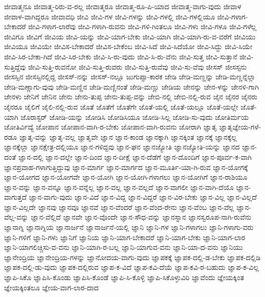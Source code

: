 {ಜೀವಾತ್ಮನೂ
ಜೀವಾತ್ಮ-ರಿರು-ವ-ರಲ್ಲ
ಜೀವಾತ್ಮರೂ
ಜೀವಾತ್ಮ-ರೂ-ಪಿ-ಯಾದ
ಜೀವಾತ್ಮ-ವಾಗು-ವುದು
ಜೀವಾಳ
ಜೀವಾಳ-ವಾಗಿದ್ದರೂ
ಜೀವಾವಧಿ
ಜೀವಿ
ಜೀವಿ-ಗಳ
ಜೀವಿ-ಗಳನ್ನು
ಜೀವಿ-ಗಳಲ್ಲಿ
ಜೀವಿ-ಗಳಲ್ಲಿಯೂ
ಜೀವಿ-ಗಳಾಗ-ಬೇಕಾದರೆ
ಜೀವಿ-ಗಳಾಗ-ಲಾರೆವು
ಜೀವಿ-ಗಳಾಗಿ-ರುವನು
ಜೀವಿ-ಗಳಿ-ಗಿಂತಲೂ
ಜೀವಿ-ಗಳು
ಜೀವಿ-ಗಳೂ
ಜೀವಿ-ಗಳೆಲ್ಲ
ಜೀವಿಗೂ
ಜೀವಿಗೆ
ಜೀವಿಯ
ಜೀವಿ-ಯನ್ನು
ಜೀವಿ-ಯಾಗ-ಬೇಕು
ಜೀವಿ-ಯಾಗಿ
ಜೀವಿ-ಯಾಗಿ-ರು-ವ-ವರೆಗೆ
ಜೀವಿಯು
ಜೀವಿಯೂ
ಜೀವಿಯೇ
ಜೀವಿಸ-ಬೇಕಾದರೆ
ಜೀವಿಸ-ಬೇಕೆಂಬ
ಜೀವಿ-ಸಿದೆ
ಜೀವಿ-ಸಿದೆಯೋ
ಜೀವಿ-ಸಿದ್ದು
ಜೀವಿ-ಸಿಯೇ
ಜೀವಿ-ಸಿರ-ಬೇಕಾ-ಗಿದೆ
ಜೀವಿ-ಸಿರ-ಬೇಕು
ಜೀವಿ-ಸಿ-ರು-ವುದು
ಜೀವಿ-ಸಿ-ರು-ವೆನು
ಜೀವಿ-ಸುತ್ತ
ಜೀವಿ-ಸುತ್ತಾನೆ
ಜೀವಿ-ಸುತ್ತಿದ್ದೆವು
ಜೀವಿ-ಸುತ್ತಿ-ರುವನೋ
ಜೀವಿ-ಸುತ್ತಿ-ರುವರು
ಜೀವಿ-ಸುತ್ತಿ-ರುವೆವು
ಜೀವಿ-ಸು-ವೆವು
ಜೀಸಸ್
ಜೀಸಸ್ಸನು
ಜೀಸಸ್ಸಿನ
ಜೀಸಸ್ಸಿನಲ್ಲಿದ್ದ
ಜೀಸಸ್-ನನ್ನು
ಜೀಸಸ್-ನಲ್ಲೂ
ಜುಗುಪ್ಸಾ-ಕಾರಕ
ಜೇಡಿ
ಜೇಡಿ-ಮಣ್ಣನ್ನು
ಜೇಡಿ-ಮಣ್ಣನ್ನೆಲ್ಲಾ
ಜೇಡಿ-ಮಣ್ಣಾಗು-ವುವು
ಜೇಡಿ-ಮಣ್ಣಿನ
ಜೇಡಿ-ಮಣ್ಣಿನಂತೆ
ಜೇಡಿ-ಮಣ್ಣು
ಜೇಡಿಯ
ಜೇನನ್ನು
ಜೇನ-ಳನ್ನು
ಜೇನಳಿ-ಗಾಗಿ
ಜೇನಳು
ಜೇನಿಗೆ
ಜೇನಿನ
ಜೇನು
ಜೇನು-ತುಪ್ಪ
ಜೇನು-ತುಪ್ಪ-ವನ್ನು
ಜೇಬಿ-ನಲ್ಲಿ
ಜೇಬಿ-ನಲ್ಲಿ-ರುವ
ಜೈನ
ಜೈನರ
ಜೈನರು
ಜೈನರೂ
ಜೈಲಿಗೆ
ಜೈಲಿ-ನಲ್ಲಿ-ರುವ
ಜೊತೆ
ಜೊತೆಗೆ
ಜೊತೆಗೇ
ಜೊತೆ-ಯಲ್ಲಿ
ಜೊತೆ-ಯಲ್ಲೂ
ಜೊತೆ-ಯಲ್ಲೇ
ಜೊತೆ-ಯಾಗಿ
ಜೊರಾಸ್ಟರ್
ಜೋಡಿ-ಯನ್ನು
ಜೋಡಿಸಿ
ಜೋಡಿಸಿಯೂ
ಜೋಡಿ-ಸಿಲ್ಲ
ಜೋಡಿ-ಸು-ವುದು
ಜೋತಿರ್ಮಯ
ಜೋತಿರ್ವಿದ್ಯೆ
ಜೋಪಾನ
ಜೋಪಾನ-ವಾಗಿ-ರ-ಬೇಕು
ಜೋಪಾನ-ವಾಗಿ-ರುವನು
ಜೋರಾಗಿ
ಜ್ಞಾತೃ
ಜ್ಞಾತೃಜ್ಞೇಯ-ಗಳೆ-ರಡೂ
ಜ್ಞಾತೃ-ವನ್ನು
ಜ್ಞಾತೃ-ವಲ್ಲ
ಜ್ಞಾತೃವೇ
ಜ್ಞಾನ
ಜ್ಞಾನ-ಕಾಂಡ
ಜ್ಞಾನಕ್ಕಾಗಿ
ಜ್ಞಾನಕ್ಕಿಂತ
ಜ್ಞಾನಕ್ಕೆ
ಜ್ಞಾನಕ್ಕೆಲ್ಲ
ಜ್ಞಾನಕ್ಕೆಲ್ಲಾ
ಜ್ಞಾನಕ್ಷೇತ್ರ-ದಲ್ಲಿಯೂ
ಜ್ಞಾನ-ಗಳಿದ್ದವು
ಜ್ಞಾನ-ಘನ
ಜ್ಞಾನಜ್ಯೋತಿ
ಜ್ಞಾನಜ್ಯೋತಿ-ಯನ್ನು
ಜ್ಞಾನದ
ಜ್ಞಾನ-ದಂತೆ
ಜ್ಞಾನ-ದಲ್ಲಿ
ಜ್ಞಾನ-ದಲ್ಲೇ
ಜ್ಞಾನ-ದಿಂದ
ಜ್ಞಾನ-ದೀಕ್ಷೆ
ಜ್ಞಾನ-ದೆಡೆಗೆ
ಜ್ಞಾನ-ದೊಂದಿಗೆ
ಜ್ಞಾನ-ಪೂರ್ವ-ಕ-ವಾಗಿ
ಜ್ಞಾನಪ್ರವಾಹ-ಗಳಾಗುತ್ತಿದ್ದುವು
ಜ್ಞಾನ-ಮಾರ್ಗ
ಜ್ಞಾನ-ಮಾರ್ಗದ
ಜ್ಞಾನ-ಮೂರ್ತಿ-ಯಾ-ಗಿ-ರುವ
ಜ್ಞಾನ-ಯೋಗಕ್ಕೆ
ಜ್ಞಾನ-ಯೋಗದ
ಜ್ಞಾನ-ಯೋಗವೇ
ಜ್ಞಾನ-ಯೋಗಿ
ಜ್ಞಾನ-ಯೋಗಿ-ಗಳಾಗಲು
ಜ್ಞಾನ-ಯೋಗಿಗೆ
ಜ್ಞಾನ-ರಾಶಿಯೂ
ಜ್ಞಾನ-ವನ್ನು
ಜ್ಞಾನ-ವನ್ನೂ
ಜ್ಞಾನ-ವನ್ನೆಲ್ಲ
ಜ್ಞಾನ-ವಲ್ಲ
ಜ್ಞಾನ-ವಲ್ಲದೆ
ಜ್ಞಾನ-ವಾಗಲೀ
ಜ್ಞಾನ-ವಾಗಿ-ದೆಯೊ
ಜ್ಞಾನ-ವಾಗುತ್ತದೆ
ಜ್ಞಾನ-ವಾಗು-ವುದು
ಜ್ಞಾನ-ವಿದೆ
ಜ್ಞಾನ-ವಿದ್ದ
ಜ್ಞಾನ-ವಿದ್ದರೆ
ಜ್ಞಾನ-ವಿರ-ಬೇಕು
ಜ್ಞಾನ-ವಿಲ್ಲ
ಜ್ಞಾನ-ವಿಲ್ಲದೆ
ಜ್ಞಾನ-ವಿಲ್ಲದೇ
ಜ್ಞಾನವು
ಜ್ಞಾನವೂ
ಜ್ಞಾನವೆ
ಜ್ಞಾನ-ವೆಂದರೆ
ಜ್ಞಾನ-ವೆಂದ-ರೇನು
ಜ್ಞಾನ-ವೆಂಬ
ಜ್ಞಾನ-ವೆಲ್ಲ
ಜ್ಞಾನ-ವೆಲ್ಲ-ವನ್ನು
ಜ್ಞಾನ-ವೆಲ್ಲಿದೆ
ಜ್ಞಾನವೇ
ಜ್ಞಾನ-ವೊಂದೇ
ಜ್ಞಾನ-ಸೌಧ-ವನ್ನು
ಜ್ಞಾನಸ್ನಾನ
ಜ್ಞಾನಸ್ವರೂಪ-ನಾಗಿ-ರುವೆನು
ಜ್ಞಾನಾಗ್ನಿ
ಜ್ಞಾನಾಗ್ನಿಯ
ಜ್ಞಾನಾರ್ಜನೆ
ಜ್ಞಾನಾರ್ಜನೆ-ಯಲ್ಲಿ
ಜ್ಞಾನಿ
ಜ್ಞಾನಿ-ಗಳ
ಜ್ಞಾನಿ-ಗಳಾಗಲು
ಜ್ಞಾನಿ-ಗಳಾಗು-ವರು
ಜ್ಞಾನಿ-ಗಳಿಗೆ
ಜ್ಞಾನಿ-ಗಳು
ಜ್ಞಾನಿಗೆ
ಜ್ಞಾನಿಯ
ಜ್ಞಾನಿ-ಯಾಗ-ಬೇಕಾದರೆ
ಜ್ಞಾನಿ-ಯಾಗ-ಬೇಕು
ಜ್ಞಾನಿ-ಯಾಗ-ಲಾರ
ಜ್ಞಾನಿ-ಯಾಗಲಿಚ್ಚಿಸು-ವ-ವನು
ಜ್ಞಾನಿ-ಯಾಗಿ-ರ-ಬಲ್ಲ
ಜ್ಞಾನಿ-ಯಾಗುವ-ವನು
ಜ್ಞಾನಿ-ಯಾ-ದ-ವನು
ಜ್ಞಾನಿಯು
ಜ್ಞಾನೇಂದ್ರಿಯ
ಜ್ಞಾನೇಂದ್ರಿಯ-ಗಳನ್ನು
ಜ್ಞಾನೋದಯ-ವಾಗು-ವುದು
ಜ್ಞಾಪಕಕ್ಕೆ
ಜ್ಞಾಪಕ-ದಲ್ಲಿ-ಡ-ಬೇಕು
ಜ್ಞಾಪಕ-ದಲ್ಲಿಡಿ
ಜ್ಞಾಪಕ-ದಲ್ಲಿ-ಡು-ವುದು
ಜ್ಞಾಪಕ-ದಲ್ಲಿರುವ
ಜ್ಞಾಪ-ಕ-ವಿದೆ
ಜ್ಞಾಪ-ಕವಿ-ದೆಯೆ
ಜ್ಞಾಪ-ಕವಿ-ರ-ಬಹುದು
ಜ್ಞಾಪ-ಕ-ವಿಲ್ಲ
ಜ್ಞಾಪಿ-ಸಿಕೊ
ಜ್ಞಾಪಿಸಿ-ಕೊಂಡು
ಜ್ಞಾಪಿಸಿ-ಕೊಂಡೆ
ಜ್ಞಾಪಿ-ಸಿ-ಕೊಳ್ಳಿ
ಜ್ಞಾಪಿ-ಸಿಕೊಳ್ಳುವಿರಿ
ಜ್ಞಾವೆಂದು
ಜ್ಞೇಯಕ್ಕಿಂತ
ಜ್ಞೇಯಕ್ಕಿಂತಲೂ
ಜ್ಞೇಯ-ವಾಗ-ಲಾರ-ದಾದ
}
